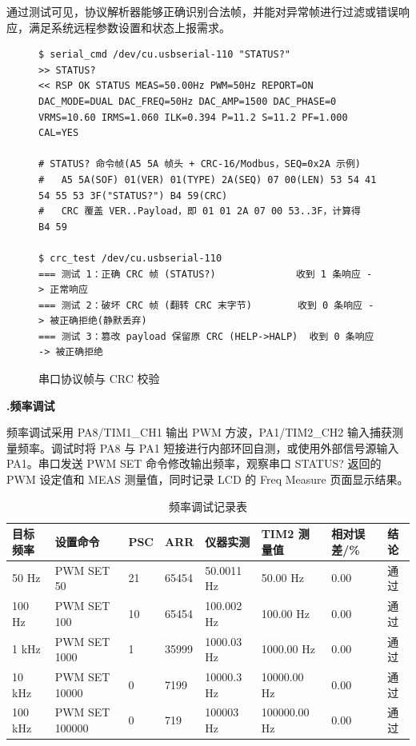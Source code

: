\documentclass[UTF8,a4paper,zihao=-4,fontset=macnew]{ctexart}
\makeatletter
\def\@extractsubnum#1.#2\@nil{#2}
\newcommand{\subsectiontitle}[2]{%
  \setcounter{subsection}{\numexpr\@extractsubnum#1\@nil-1\relax}\refstepcounter{subsection}%
  \vspace{0.34cm}%
  {\noindent\heiti\bfseries\fontsize{16pt}{18pt}\selectfont #1.\quad #2\par}%
  \vspace{0.54cm}%
}
\makeatother
\begin{document}
通过测试可见，协议解析器能够正确识别合法帧，并能对异常帧进行过滤或错误响应，满足系统远程参数设置和状态上报需求。

\begin{figure}[H]
\centering
\begin{lstlisting}[style=serialterm]
$ serial_cmd /dev/cu.usbserial-110 "STATUS?"
>> STATUS?
<< RSP OK STATUS MEAS=50.00Hz PWM=50Hz REPORT=ON DAC_MODE=DUAL DAC_FREQ=50Hz DAC_AMP=1500 DAC_PHASE=0 VRMS=10.60 IRMS=1.060 ILK=0.394 P=11.2 S=11.2 PF=1.000 CAL=YES

# STATUS? 命令帧(A5 5A 帧头 + CRC-16/Modbus，SEQ=0x2A 示例)
#   A5 5A(SOF) 01(VER) 01(TYPE) 2A(SEQ) 07 00(LEN) 53 54 41 54 55 53 3F("STATUS?") B4 59(CRC)
#   CRC 覆盖 VER..Payload，即 01 01 2A 07 00 53..3F，计算得 B4 59

$ crc_test /dev/cu.usbserial-110
=== 测试 1：正确 CRC 帧 (STATUS?)              收到 1 条响应 -> 正常响应
=== 测试 2：破坏 CRC 帧 (翻转 CRC 末字节)        收到 0 条响应 -> 被正确拒绝(静默丢弃)
=== 测试 3：篡改 payload 保留原 CRC (HELP->HALP)  收到 0 条响应 -> 被正确拒绝
\end{lstlisting}
\caption{串口协议帧与 CRC 校验}
\label{fig:protocol-hex}
\end{figure}

\subsectiontitle{7.2}{频率调试}
\label{sec:debug-frequency}

频率调试采用 PA8/TIM1\_CH1 输出 PWM 方波，PA1/TIM2\_CH2 输入捕获测量频率。调试时将 PA8 与 PA1 短接进行内部环回自测，或使用外部信号源输入 PA1。串口发送 PWM SET 命令修改输出频率，观察串口 STATUS? 返回的 PWM 设定值和 MEAS 测量值，同时记录 LCD 的 Freq Measure 页面显示结果。

\begin{table}[H]
\centering
{}
\caption{频率调试记录表}
\label{tab:pwm-test}
\begin{tabular}{llllllll}
\toprule
目标频率 & 设置命令 & PSC & ARR & 仪器实测 & TIM2 测量值 & 相对误差/\% & 结论 \\
\midrule
50 Hz & PWM SET 50 & 21 & 65454 & 50.0011 Hz & 50.00 Hz & 0.00 & 通过 \\
100 Hz & PWM SET 100 & 10 & 65454 & 100.002 Hz & 100.00 Hz & 0.00 & 通过 \\
1 kHz & PWM SET 1000 & 1 & 35999 & 1000.03 Hz & 1000.00 Hz & 0.00 & 通过 \\
10 kHz & PWM SET 10000 & 0 & 7199 & 10000.3 Hz & 10000.00 Hz & 0.00 & 通过 \\
100 kHz & PWM SET 100000 & 0 & 719 & 100003 Hz & 100000.00 Hz & 0.00 & 通过 \\
\bottomrule
\end{tabular}
\end{table}
\end{document}

